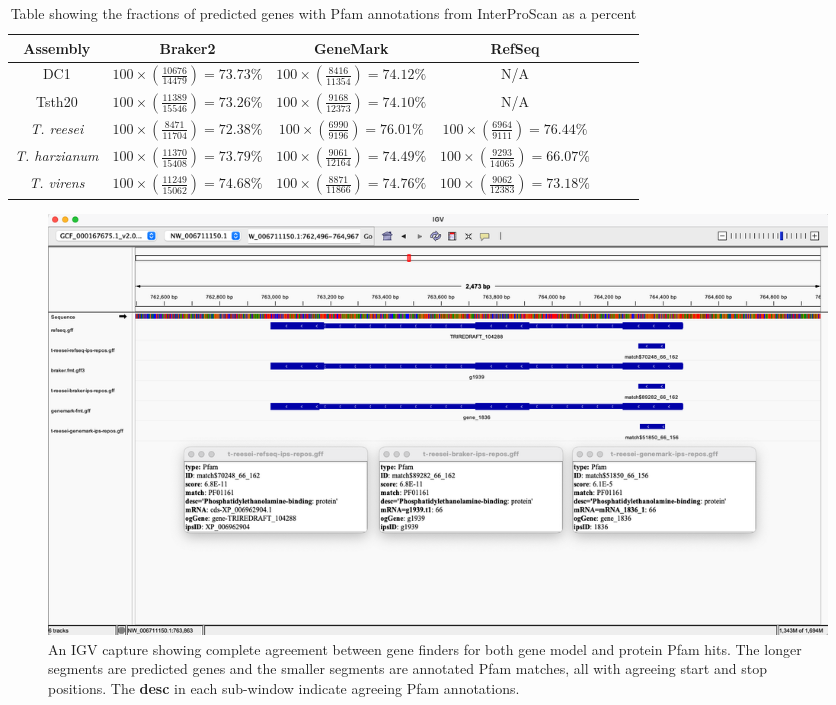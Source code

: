 \begin{table}[h!]
  \centering
  \begin{tabular}{|c|c|c|c|c|c|c|}
    \hline
    Assembly & Braker2 & GeneMark & RefSeq \\ \hline
    DC1 & $100\times(\frac{10676}{14479})=73.73\%$ & $100\times(\frac{8416}{11354})=74.12\%$ & N/A \\ \hline
    Tsth20 & $100\times(\frac{11389}{15546})=73.26\%$ & $100\times(\frac{9168}{12373})=74.10\%$ & N/A \\ \hline
    \textit{T. reesei} & $100\times(\frac{8471}{11704})=72.38\%$ & $100\times(\frac{6990}{9196})=76.01\%$ & $100\times(\frac{6964}{9111})=76.44\%$ \\ \hline
    \textit{T. harzianum} & $100\times(\frac{11370}{15408})=73.79\%$ & $100\times(\frac{9061}{12164})=74.49\%$ & $100\times(\frac{9293}{14065})=66.07\%$ \\ \hline
    \textit{T. virens} & $100\times(\frac{11249}{15062})=74.68\%$ & $100\times(\frac{8871}{11866})=74.76\%$ & $100\times(\frac{9062}{12383})=73.18\%$ \\ \hline
  \end{tabular}
  \caption[InterProScan Pfam Evidence]{Table showing the fractions of predicted
    genes with Pfam annotations from InterProScan as a percent}
  \label{table:ips-pfam}
\end{table}


\begin{figure}[h!]
  \centering
  \includegraphics[width=\textwidth]{figures/igv/ips-basic-agree.png}
  \caption[Agreeing Pfam matches]{An IGV capture showing complete
    agreement between gene finders for both gene model and protein
    Pfam hits. The longer segments are predicted genes and the smaller
    segments are annotated Pfam matches, all with agreeing start and
    stop positions. The \textbf{desc} in each sub-window indicate
    agreeing Pfam annotations.}
  \label{fig:basic-agree}
\end{figure}

